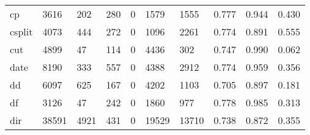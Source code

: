 \begin{longtable}{lp{2.0cm}p{2.0cm}p{2.0cm}p{2.0cm}p{2.0cm}p{2.0cm}p{2.0cm}p{2.0cm}p{2.0cm}}
cp        &                   3616 &                                202 &                               280 &                                0 &                              1579 &                            1555 &                                0.777 &                                  0.944 &                                0.430 \\
csplit    &                   4073 &                                444 &                               272 &                                0 &                              1096 &                            2261 &                                0.774 &                                  0.891 &                                0.555 \\
cut       &                   4899 &                                 47 &                               114 &                                0 &                              4436 &                             302 &                                0.747 &                                  0.990 &                                0.062 \\
date      &                   8190 &                                333 &                               557 &                                0 &                              4388 &                            2912 &                                0.774 &                                  0.959 &                                0.356 \\
dd        &                   6097 &                                625 &                               167 &                                0 &                              4202 &                            1103 &                                0.705 &                                  0.897 &                                0.181 \\
df        &                   3126 &                                 47 &                               242 &                                0 &                              1860 &                             977 &                                0.778 &                                  0.985 &                                0.313 \\
dir       &                  38591 &                               4921 &                               431 &                                0 &                             19529 &                           13710 &                                0.738 &                                  0.872 &                                0.355 \\

\end{longtable}
